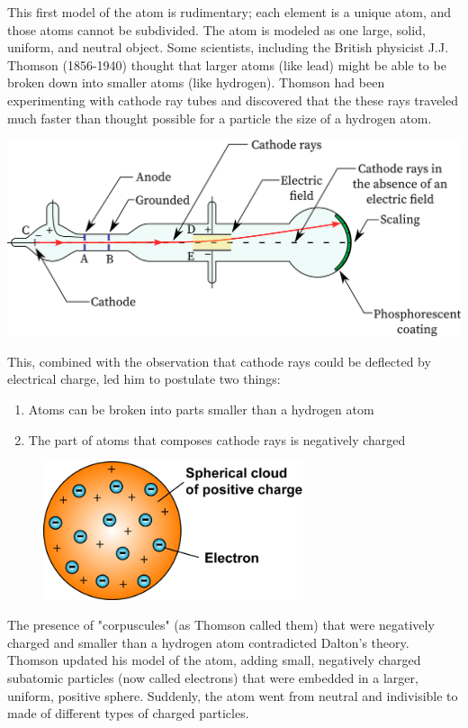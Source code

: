 This first model of the atom is rudimentary; each element is a unique atom,
and those atoms cannot be subdivided. The atom is modeled as one large, solid, uniform,
and neutral object. Some scientists, including the British physicist J.J. Thomson
(1856-1940) thought that larger atoms (like lead) might be able to be broken down
into smaller atoms (like hydrogen). Thomson had been experimenting with cathode
ray tubes and discovered that the these rays traveled much faster than thought
possible for a particle the size of a hydrogen atom.

\includegraphics[width=1\textwidth]{cathode-ray-tube.png}

This, combined with the observation that cathode rays could be deflected by
electrical charge, led him to postulate two things:

\begin{enumerate}
\item Atoms can be broken into parts smaller than a hydrogen atom
\item The part of atoms that composes cathode rays is negatively charged
\end{enumerate}

\begin{figure}
\noindent\includegraphics[width=3in]{thomson_model.png}
\end{figure}

The presence of "corpuscules" (as Thomson called them) that were negatively
charged and smaller than a hydrogen atom contradicted Dalton's theory. Thomson
updated his model of the atom, adding small, negatively charged subatomic
particles (now called electrons) that were embedded in a larger, uniform, positive
sphere. Suddenly, the atom went from neutral and indivisible to made of different
types of charged particles.

